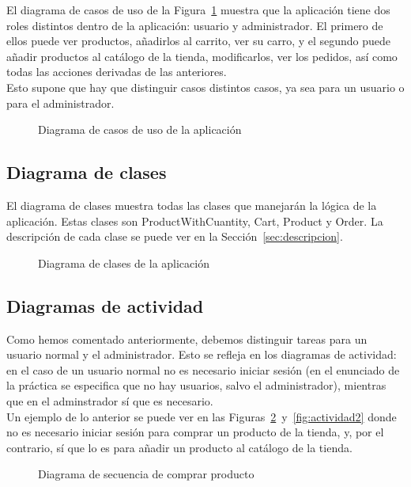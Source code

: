 \documentclass[12pt,a4paper,svgnames]{article}
\begin{document}
El diagrama de casos de uso de la Figura~\ref{fig:casosdeuso} muestra que la aplicación tiene dos roles distintos dentro de la aplicación: usuario y administrador. El primero de ellos puede ver productos, añadirlos al carrito, ver su carro, y el segundo puede añadir productos al catálogo de la tienda, modificarlos, ver los pedidos, así como todas las acciones derivadas de las anteriores.\\

Esto supone que hay que distinguir casos distintos casos, ya sea para un usuario o para el administrador.  
\begin{figure}[htbp]
	\centering
	\casosdeuso
	\caption{Diagrama de casos de uso de la aplicación}
	\label{fig:casosdeuso}
\end{figure}

\clearpage

\subsection{Diagrama de clases}

El diagrama de clases muestra todas las clases que manejarán la lógica de la aplicación. Estas clases son ProductWithCuantity, Cart, Product y Order. La descripción de cada clase se puede ver en la Sección~\ref{sec:descripcion}.

\begin{figure}[htbp] 
	\centering
	\clases
	\caption{Diagrama de clases de la aplicación}
\end{figure}

\subsection{Diagramas de actividad}

Como hemos comentado anteriormente, debemos distinguir tareas para un usuario normal y el administrador. Esto se refleja en los diagramas de actividad: en el caso de un usuario normal no es necesario iniciar sesión (en el enunciado de la práctica se especifica que no hay usuarios, salvo el administrador), mientras que en el adminstrador sí que es necesario.\\

Un ejemplo de lo anterior se puede ver en las Figuras~\ref{fig:actividad1}~y~\ref{fig:actividad2} donde no es necesario iniciar sesión para comprar un producto de la tienda, y, por el contrario, sí que lo es para añadir un producto al catálogo de la tienda.  

\begin{figure}[htbp] 
	\centering
	\comprarproducto
	\caption{Diagrama de secuencia de comprar producto}
	\label{fig:actividad1}
\end{figure}
\end{document}
